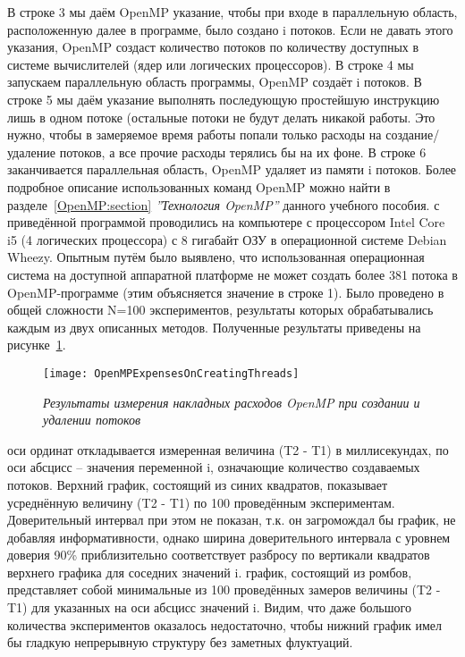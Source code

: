 {	\begin{figure}[H]
		
	\end{figure}
	В строке 3 мы даём OpenMP указание, чтобы при входе в параллельную область, расположенную далее в программе, было создано i потоков. Если не давать этого указания, OpenMP создаст количество потоков по количеству доступных в системе вычислителей (ядер или логических процессоров). В строке 4 мы запускаем параллельную область программы, OpenMP создаёт i потоков. В строке 5 мы даём указание выполнять последующую простейшую инструкцию лишь в одном потоке (остальные потоки не будут делать никакой работы. Это нужно, чтобы в замеряемое время работы попали только расходы на создание/удаление потоков, а все прочие расходы терялись бы на их фоне. В строке 6 заканчивается параллельная область, OpenMP удаляет из памяти i потоков. Более подробное описание использованных команд OpenMP можно найти в разделе~\ref{OpenMP:section} \textit{''Технология OpenMP''} данного учебного  пособия.
	 с приведённой программой проводились на компьютере с процессором Intel Core i5 (4 логических процессора) с 8 гигабайт ОЗУ в операционной системе Debian Wheezy. Опытным путём было выявлено, что использованная операционная система на доступной аппаратной платформе не может создать более 381 потока в OpenMP-программе (этим объясняется значение в строке 1). Было проведено в общей сложности N=100 экспериментов, результаты которых обрабатывались каждым из двух описанных методов. Полученные результаты приведены на рисунке~\ref{OpenMPExpensesOnCreatingThreads:image}.
	\begin{figure}[H]
		\texttt{[image: OpenMPExpensesOnCreatingThreads]}
		\caption{\textit{Результаты измерения накладных расходов OpenMP при создании и удалении потоков}}
		\label{OpenMPExpensesOnCreatingThreads:image}
	\end{figure} 
	 оси ординат откладывается измеренная величина (T2 - T1) в миллисекундах, по оси абсцисс – значения переменной i, означающие количество создаваемых потоков. Верхний график, состоящий из синих квадратов, показывает усреднённую величину (T2 - T1) по 100 проведённым экспериментам. Доверительный интервал при этом не показан, т.к. он загромождал бы график, не добавляя информативности, однако ширина доверительного интервала с уровнем доверия 90\% приблизительно соответствует разбросу по вертикали квадратов верхнего графика для соседних значений i. 
	 график, состоящий из ромбов, представляет собой минимальные из 100 проведённых замеров величины (T2 -  T1) для указанных на оси абсцисс значений i. Видим, что даже большого количества экспериментов оказалось недостаточно, чтобы нижний график имел бы гладкую непрерывную структуру без заметных флуктуаций.

}